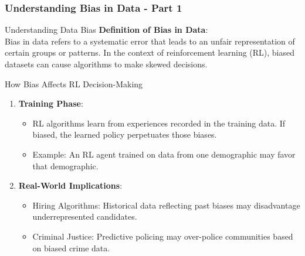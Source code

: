 \documentclass[aspectratio=169]{beamer}
\begin{document}
\begin{frame}[fragile]
    \frametitle{Understanding Bias in Data - Part 1}
    \begin{block}{Understanding Data Bias}
        \textbf{Definition of Bias in Data}:\\
        Bias in data refers to a systematic error that leads to an unfair representation of certain groups or patterns. In the context of reinforcement learning (RL), biased datasets can cause algorithms to make skewed decisions.
    \end{block}
    
    \begin{block}{How Bias Affects RL Decision-Making}
        \begin{enumerate}
            \item \textbf{Training Phase}:
              \begin{itemize}
                  \item RL algorithms learn from experiences recorded in the training data. If biased, the learned policy perpetuates those biases.
                  \item Example: An RL agent trained on data from one demographic may favor that demographic.
              \end{itemize}
            \item \textbf{Real-World Implications}:
              \begin{itemize}
                  \item Hiring Algorithms: Historical data reflecting past biases may disadvantage underrepresented candidates. 
                  \item Criminal Justice: Predictive policing may over-police communities based on biased crime data.
              \end{itemize}
        \end{enumerate}
    \end{block}
\end{frame}
\end{document}
